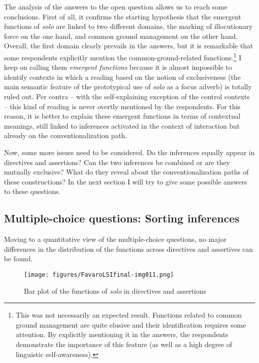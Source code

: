 The analysis of the answers to the open question allows us to reach some conclusions. First of all, it confirms the starting hypothesis that the emergent functions of \textit{solo} are linked to two different domains, the marking of illocutionary force on the one hand, and common ground management on the other hand. Overall, the first domain clearly prevails in the answers, but it is remarkable that some respondents explicitly mention the common-ground-related functions.\footnote{This was not necessarily an expected result. Functions related to common ground management are quite elusive and their identification requires some attention. By explicitly mentioning it in the answers, the respondents demonstrate the importance of this feature (as well as a high degree of linguistic self-awareness).} I keep on calling them \textit{emergent functions} because it is almost impossible to identify contexts in which a reading based on the notion of exclusiveness (the main semantic feature of the prototypical use of \textit{solo} as a focus adverb) is totally ruled out. Per contra – with the self-explaining exception of the control contexts – this kind of reading is never overtly mentioned by the respondents. For this reason, it is better to explain these emergent functions in terms of contextual meanings, still linked to inferences activated in the context of interaction but already on the conventionalization path.

Now, some more issues need to be considered. Do the inferences equally appear in directives and assertions? Can the two inferences be combined or are they mutually exclusive? What do they reveal about the conventionalization paths of these constructions? In the next section I will try to give some possible answers to these questions.

\subsection{Multiple-choice questions: Sorting inferences}
\hypertarget{Toc124860678}{}
Moving to a quantitative view of the multiple-choice questions, no major differences in the distribution of the functions across directives and assertives can be found.


\begin{figure}
\texttt{[image: figures/FavaroLSIfinal-img011.png]}
\caption{\label{fig:key:8.11} Bar plot of the functions of \textit{solo} in directives and assertions}
\end{figure}

